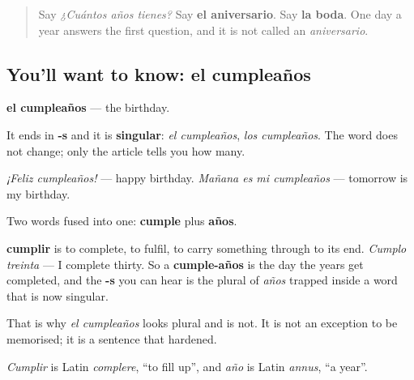 \label{lesson:ES-C440-cumpleanos}



\begin{quote}
Say \emph{¿Cuántos años tienes?} Say \textbf{el aniversario}. Say \textbf{la boda}. One day a year answers the first question, and it is not called an \emph{aniversario}.
\end{quote}

\subsection*{You'll want to know: el cumpleaños}
\textbf{el cumpleaños} — the birthday.

It ends in \textbf{-s} and it is \textbf{singular}: \emph{el cumpleaños}, \emph{los cumpleaños}. The word does not change; only the article tells you how many.

\emph{¡Feliz cumpleaños!} — happy birthday. \emph{Mañana es mi cumpleaños} — tomorrow is my birthday.

\begin{cousinweb}
Two words fused into one: \textbf{cumple} plus \textbf{años}.

\textbf{cumplir} is to complete, to fulfil, to carry something through to its end. \emph{Cumplo treinta} — I complete thirty. So a \textbf{cumple-años} is the day the years get completed, and the \textbf{-s} you can hear is the plural of \emph{años} trapped inside a word that is now singular.

That is why \emph{el cumpleaños} looks plural and is not. It is not an exception to be memorised; it is a sentence that hardened.

\emph{Cumplir} is Latin \emph{complere}, \textquotedblleft{}to fill up\textquotedblright{}, and \emph{año} is Latin \emph{annus}, \textquotedblleft{}a year\textquotedblright{}.
\end{cousinweb}

